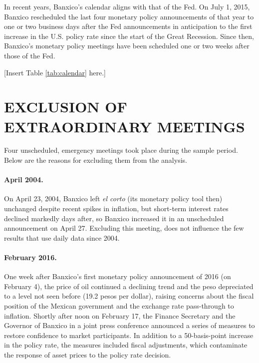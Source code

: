 \documentclass[a4paper,12pt]{article} 		%
\newcommand{\sectitlespace}{\vspace{0.1in}}
\begin{document}
\begin{appendices}
In recent years, Banxico's calendar aligns with that of the Fed. On July 1, 2015, Banxico rescheduled the last four monetary policy announcements of that year to one or two business days after the Fed announcements in anticipation to the first increase in the U.S. policy rate since the start of the Great Recession. Since then, Banxico's monetary policy meetings have been scheduled one or two weeks after those of the Fed.

\begin{center}
	[Insert Table \ref{tab:calendar} here.]
\end{center}

\sectitlespace
\section{EXCLUSION OF EXTRAORDINARY MEETINGS} \label{sec:exclusions}
\sectitlespace

Four unscheduled, emergency meetings took place during the sample period. Below are the reasons for excluding them from the analysis. 

\paragraph{April 2004.} On April 23, 2004, Banxico left \textit{el corto} (its monetary policy tool then) unchanged despite recent spikes in inflation, but short-term interest rates declined markedly days after, so Banxico increased it in an unscheduled announcement on April 27. Excluding this meeting, does not influence the few results that use daily data since 2004. 

\paragraph{February 2016.} One week after Banxico's first monetary policy announcement of 2016 (on February 4), the price of oil continued a declining trend and the peso depreciated to a level not seen before (19.2 pesos per dollar), raising concerns about the fiscal position of the Mexican government and the exchange rate pass-through to inflation.
Shortly after noon on February 17, the Finance Secretary and the Governor of Banxico in a joint press conference announced a series of measures to restore confidence to market participants. In addition to a 50-basis-point increase in the policy rate, the measures included fiscal adjustments, which contaminate the response of asset prices to the policy rate decision. 


\end{appendices}
\end{document}

